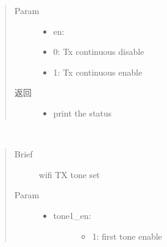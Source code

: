 \documentclass[letterpaper,10pt,english]{sphinxhowto}
\begin{document}
\begin{fulllineitems}
\begin{fulllineitems}
\begin{quote}
\begin{description}
\item[{Param}] \leavevmode\begin{itemize}
\item {} 
en:

\item {} 
0: Tx continuous disable

\item {} 
1: Tx continuous enable

\end{itemize}

\item[{返回}] \leavevmode
\begin{itemize}
\item {} 
print the status

\end{itemize}


\end{description}\end{quote}

\end{fulllineitems}


\begin{fulllineitems}
\label{\detokenize{rfapi/index:wifi_api.WIFIAPI.txstart}}
\end{fulllineitems}


\begin{fulllineitems}
\label{\detokenize{rfapi/index:wifi_api.WIFIAPI.txtone}}~\begin{quote}\begin{description}
\item[{Brief}] \leavevmode
wifi TX tone set

\item[{Param}] \leavevmode\begin{itemize}
\item {} \begin{description}
\item[{tone1\_en:}] \leavevmode\begin{itemize}
\item {} 
1: first tone enable


\end{itemize}
\end{description}
\end{itemize}
\end{description}
\end{quote}
\end{fulllineitems}
\end{fulllineitems}
\end{document}

